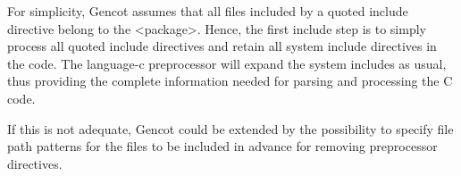 For simplicity, Gencot assumes that all files included by a quoted include directive belong to the <package>. Hence,
the first include step is to simply process all quoted include directives and retain all system include directives in
the code. The language-c preprocessor will expand the system includes as usual, thus providing the complete 
information needed for parsing and processing the C code.

If this is not adequate, Gencot could be extended by the possibility to specify file path patterns for the files to
be included in advance for removing preprocessor directives.

 

